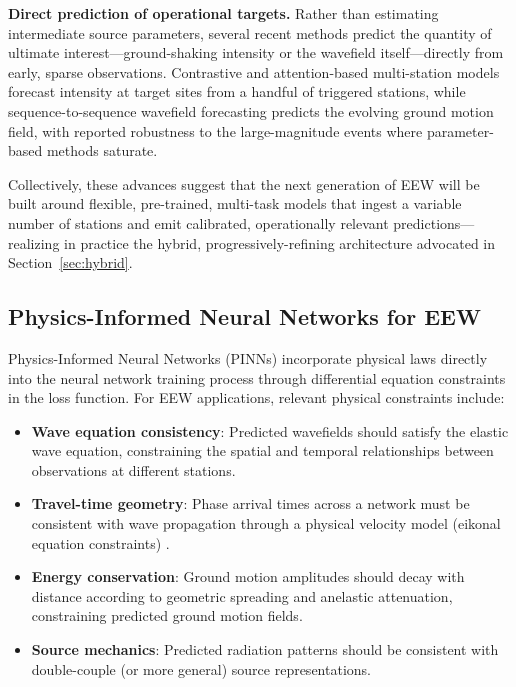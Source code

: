 \documentclass[review,authoryear]{elsarticle}
\begin{document}
\textbf{Direct prediction of operational targets.} Rather than estimating intermediate source parameters, several recent methods predict the quantity of ultimate interest---ground-shaking intensity or the wavefield itself---directly from early, sparse observations. Contrastive and attention-based multi-station models \citep{murshed2024scgnn, huang2024sense} forecast intensity at target sites from a handful of triggered stations, while sequence-to-sequence wavefield forecasting \citep{lyu2025wavecastnet} predicts the evolving ground motion field, with reported robustness to the large-magnitude events where parameter-based methods saturate.

Collectively, these advances suggest that the next generation of EEW will be built around flexible, pre-trained, multi-task models that ingest a variable number of stations and emit calibrated, operationally relevant predictions---realizing in practice the hybrid, progressively-refining architecture advocated in Section~\ref{sec:hybrid}.

\subsection{Physics-Informed Neural Networks for EEW}

Physics-Informed Neural Networks (PINNs) \citep{raissi2019physics, karniadakis2021physics} incorporate physical laws directly into the neural network training process through differential equation constraints in the loss function. For EEW applications, relevant physical constraints include:

\begin{itemize}
\item \textbf{Wave equation consistency}: Predicted wavefields should satisfy the elastic wave equation, constraining the spatial and temporal relationships between observations at different stations.
\item \textbf{Travel-time geometry}: Phase arrival times across a network must be consistent with wave propagation through a physical velocity model (eikonal equation constraints) \citep{smith2022hyposvi}.
\item \textbf{Energy conservation}: Ground motion amplitudes should decay with distance according to geometric spreading and anelastic attenuation, constraining predicted ground motion fields.
\item \textbf{Source mechanics}: Predicted radiation patterns should be consistent with double-couple (or more general) source representations.
\end{itemize}
\end{document}
